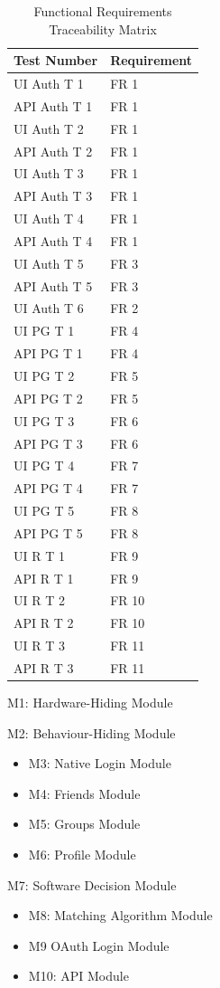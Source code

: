 \documentclass[12pt, titlepage]{article}
\begin{document}
\begin{table}[H]
	\caption{Functional Requirements Traceability Matrix} \label{TraceMatrix1}
	\begin{tabular}{ll}
		\toprule
		\textbf{Test Number} & \textbf{Requirement} \\
		\midrule
		UI Auth T 1 & FR 1\\
		API Auth T 1 & FR 1\\
		UI Auth T 2 & FR 1\\
		API Auth T 2 & FR 1\\
		UI Auth T 3 & FR 1\\
		API Auth T 3 & FR 1\\
		UI Auth T 4 & FR 1\\
		API Auth T 4 & FR 1\\
		UI Auth T 5 & FR 3\\
		API Auth T 5 & FR 3\\
		UI Auth T 6 & FR 2\\
		\midrule
		UI PG T 1 & FR 4\\
		API PG T 1 & FR 4\\
		UI PG T 2 & FR 5\\
		API PG T 2 & FR 5\\
		UI PG T 3 & FR 6\\
		API PG T 3 & FR 6\\
		UI PG T 4 & FR 7\\
		API PG T 4 & FR 7\\
		UI PG T 5 & FR 8\\
		API PG T 5 & FR 8\\
		\midrule
		UI R T 1 & FR 9\\
		API R T 1 & FR 9\\
		UI R T 2 & FR 10\\
		API R T 2 & FR 10\\
		UI R T 3 & FR 11\\
		API R T 3 & FR 11\\
		\bottomrule
	\end{tabular}
\end{table}

\begin{description}
	\item M1: Hardware-Hiding Module
	\item M2: Behaviour-Hiding Module
	\begin{itemize}
		\item M3: Native Login Module
		\item M4: Friends Module
		\item M5: Groups Module
		\item M6: Profile Module
	\end{itemize}
	\item M7: Software Decision Module
	\begin{itemize}
		\item M8: Matching Algorithm Module
		\item M9 OAuth Login Module
		\item M10: API Module
	\end{itemize}
\end{description}
\end{document}
